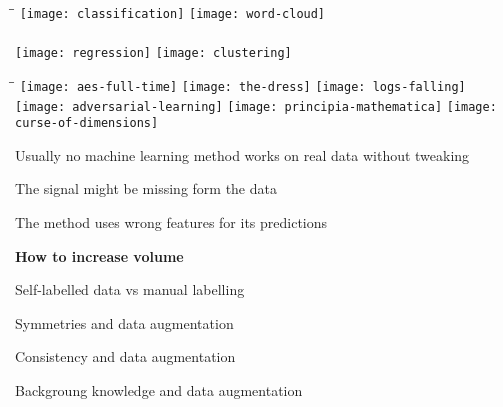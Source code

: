 \documentclass[landscape,footrule]{foils}
\begin{document}
\enlargethispage{3cm}
\begin{tabbing}
 \hspace*{2cm}\=\hspace*{10cm}\=\kill
   \>\texttt{[image: classification]} \> \texttt{[image: word-cloud]}\\  \vspace*{1cm} \\
   \>\texttt{[image: regression]}   \>  \texttt{[image: clustering]}\\
\end{tabbing}


\enlargethispage{3cm}
\begin{tabbing}
 \hspace*{2cm}\=\hspace*{10cm}\=\kill
   \> \texttt{[image: aes-full-time]}
   \> \texttt{[image: the-dress]}
\hspace*{0.15cm}
\texttt{[image: logs-falling]}\\

   \> \texttt{[image: adversarial-learning]}
   \>  \texttt{[image: principia-mathematica]}
       \texttt{[image: curse-of-dimensions]}

\end{tabbing}





Usually no machine learning method works on real data without tweaking 
\begin{triangles}
 \item The signal might be missing form the data 
 \item The method uses wrong features for its predictions 
\end{triangles}



\textbf{How to increase volume}
\begin{triangles}
\item Self-labelled data vs manual labelling
\item Symmetries and data augmentation
\item Consistency and data augmentation
\item Backgroung knowledge and data augmentation
\end{triangles}
\vspace*{3ex}
\end{document}
